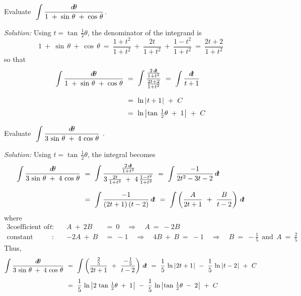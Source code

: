 \begin{exmp}\label{exmp:inthalfangle1}
\noindent Evaluate $~\displaystyle\int \frac{d\!\theta}{1 \;+\; \sin\,\theta \;+\;
\cos\,\theta} $.\vspace{1mm}
\par\noindent\emph{Solution:} Using $t = \tan\,\tfrac{1}{2}\theta$,
the denominator of the integrand is
\[
1 ~+~ \sin\,\theta ~+~ \cos\,\theta ~=~ \frac{1+t^2}{1+t^2} ~+~ \frac{2t}{1+t^2}
 ~+~ \frac{1-t^2}{1+t^2} ~=~ \frac{2t + 2}{1+t^2}
\]
so that
\begin{align*}
\int \frac{\dtheta}{1 \;+\; \sin\,\theta \;+\;
\cos\,\theta} ~&=~ \mathop{\mathlarger{\mathlarger{\int}}}
\frac{\frac{2\,\dt}{1+t^2}}{\frac{2t + 2}{1+t^2}}
~=~ \int \frac{\dt}{t+1}\\[6pt]
&=~ \ln\,\abs{t+1} ~+~ C\\
&=~ \ln\,\Abs{\tan\,\tfrac{1}{2}\theta \;+\;1} ~+~ C
\end{align*}
\end{exmp}\vspace{-2mm}
\divider
\newpage
\begin{exmp}\label{exmp:inthalfangle2}
\noindent Evaluate $~\displaystyle\int \frac{d\!\theta}{3\,\sin\,\theta \;+\;
4\,\cos\,\theta}~$.\vspace{1mm}
\par\noindent\emph{Solution:} Using $t = \tan\,\tfrac{1}{2}\theta$,
the integral becomes
\begin{align*}
\int \frac{\dtheta}{3\,\sin\,\theta \;+\;4\,\cos\,\theta} ~&=~
 \mathop{\mathlarger{\mathlarger{\int}}}
 \frac{\frac{2\,\dt}{1+t^2}}{3\,\frac{2t}{1+t^2} \;+\; 4\,\frac{1-t^2}{1+t^2}} ~=~
 \int \frac{-1}{2t^2 - 3t - 2}\,\dt\\[6pt]
&=~ \int \frac{-1}{(2t+1)\,(t-2)}\,\dt ~=~
    \int \left(\frac{A}{2t+1} ~+~ \frac{B}{t-2}\right)\,\dt
\end{align*}
where
\begin{alignat*}{3}
\text{coefficient of $t$}&: \quad & A ~+~ 2B ~&=~ 0 \quad\Rightarrow\quad A ~=~ -2B\\
\text{constant term}&: & -2A ~+~ B ~&=~ -1 \quad\Rightarrow\quad 4B ~+~ B ~=~ -1
 \quad\Rightarrow\quad B ~=~ -\frac{1}{5} ~~\text{and}~~ A ~=~ \frac{2}{5}
\end{alignat*}
Thus,
\begin{align*}
\int \frac{d\!\theta}{3\,\sin\,\theta \;+\;4\,\cos\,\theta} ~&=~
 \int \left(\frac{\frac{2}{5}}{2t+1} ~+~ \frac{-\frac{1}{5}}{t-2}\right)\,d\!t
~=~ \frac{1}{5}\,\ln\,\lvert\mspace{1mu}2t+1\mspace{1mu}\rvert ~-~ \frac{1}{5}\,\ln\,\lvert\mspace{1mu}t-2\mspace{1mu}\rvert ~+~ C\\[4pt]
&=~ \frac{1}{5}\,\ln\,\bigl\lvert\mspace{1mu}2\,\tan\,\tfrac{1}{2}\theta \;+\; 1\mspace{1mu}\bigr\rvert ~-~
    \frac{1}{5}\,\ln\,\bigl\lvert\mspace{1mu}\tan\,\tfrac{1}{2}\theta \;-\; 2\mspace{1mu}\bigr\rvert ~+~ C
\end{align*}
\end{exmp}\vspace{-2mm}
\divider
\vspace{2mm}

